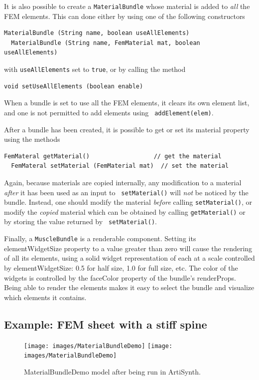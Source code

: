 It is also possible to create a {\tt MaterialBundle} whose material is
added to {\it all} the FEM elements. This can done either by using one
of the following constructors
%
\begin{lstlisting}[]
  MaterialBundle (String name, boolean useAllElements)
  MaterialBundle (String name, FemMaterial mat, boolean useAllElements)
\end{lstlisting}
%
with {\tt useAllElements} set to {\tt true}, or
by calling the method
%
\begin{lstlisting}[]
  void setUseAllElements (boolean enable)
\end{lstlisting}
%
When a bundle is set to use all the FEM elements, it clears its own
element list, and one is not permitted to add elements using {\tt
addElement(elem)}.

After a bundle has been created, it is possible to get or set
its {\sf material} property using the methods
%
\begin{lstlisting}[]
  FemMateral getMaterial()                  // get the material
  FemMateral setMaterial (FemMaterial mat)  // set the material
\end{lstlisting}
%
Again, because materials are copied internally, any modification to a
material {\it after} it has been used as an input to {\tt
setMaterial()} will {\it not} be noticed by the bundle. Instead, one
should modify the material {\it before} calling {\tt setMaterial()},
or modify the {\it copied} material which can be obtained by calling
{\tt getMaterial()} or by storing the value returned by {\tt
setMaterial()}.

Finally, a {\tt MuscleBundle} is a renderable component. Setting its
{\sf elementWidgetSize} property to a value greater than zero will
cause the rendering of all its elements, using a solid widget
representation of each at a scale controlled by {\sf elementWidgetSize}:
0.5 for half size, 1.0 for full size, etc. The color of the
widgets is controlled by the {\sf faceColor} property of the bundle's
{\sf renderProps}. Being able to render the elements makes it easy to
select the bundle and visualize which elements it contains.

\subsection{Example: FEM sheet with a stiff spine}
\label{MaterialBundleDemo:sec}

\begin{figure}[ht]
\begin{center}
\iflatexml
 \texttt{[image: images/MaterialBundleDemo]}
\else
 \texttt{[image: images/MaterialBundleDemo]}
\fi
\end{center}
\caption{MaterialBundleDemo model after being run in ArtiSynth.}
\label{MaterialBundleDemo:fig}
\end{figure}

